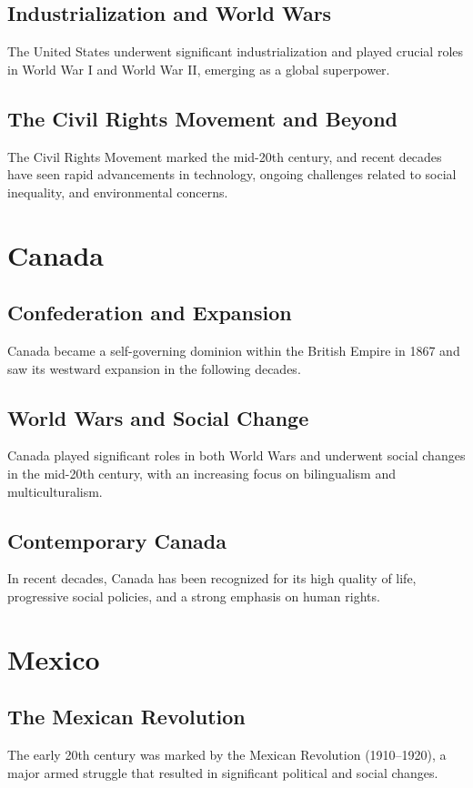 \documentclass{book}
\begin{document}
\subsection{Industrialization and World Wars}
The United States underwent significant industrialization and played crucial roles in World War I and World War II, emerging as a global superpower.

\subsection{The Civil Rights Movement and Beyond}
The Civil Rights Movement marked the mid-20th century, and recent decades have seen rapid advancements in technology, ongoing challenges related to social inequality, and environmental concerns.

\section{Canada}
\label{sec:canada}

\subsection{Confederation and Expansion}
Canada became a self-governing dominion within the British Empire in 1867 and saw its westward expansion in the following decades.

\subsection{World Wars and Social Change}
Canada played significant roles in both World Wars and underwent social changes in the mid-20th century, with an increasing focus on bilingualism and multiculturalism.

\subsection{Contemporary Canada}
In recent decades, Canada has been recognized for its high quality of life, progressive social policies, and a strong emphasis on human rights.

\section{Mexico}
\label{sec:mexico}

\subsection{The Mexican Revolution}
The early 20th century was marked by the Mexican Revolution (1910–1920), a major armed struggle that resulted in significant political and social changes.
\end{document}
